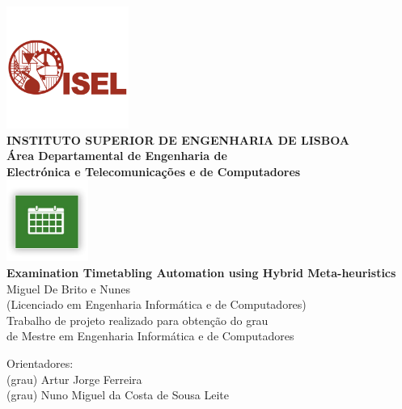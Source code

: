\begin{titlepage}
	\begin{center}
		\includegraphics[width=0.3\textwidth,natwidth=720,natheight=434]{./images/isellogo.png} \\[0.5cm]
		{\Large \textbf{INSTITUTO SUPERIOR DE ENGENHARIA DE LISBOA}} \\[0.5cm]
		{\Large \textbf{Área Departamental de Engenharia de \\Electrónica e Telecomunica\c cões e de Computadores}} \\[0.8cm]		
		\includegraphics[width=0.2\textwidth,natwidth=300,natheight=300]{./images/timetable.jpg} \\[0.8cm]
		\fontsize{18pt}{10pt}\selectfont
		{\textbf{Examination Timetabling Automation using Hybrid Meta-heuristics}} \\[0.8cm]
		\fontsize{16pt}{10pt}\selectfont
		Miguel De Brito e Nunes\\[0.2cm]
		\fontsize{14pt}{10pt}\selectfont
		(Licenciado em Engenharia Informática e de Computadores)\\[0.8cm]
		\fontsize{12pt}{10pt}\selectfont
		{Trabalho de projeto realizado para obten\c cão do grau\\de Mestre em Engenharia Informática e de Computadores} \\[0.8cm]
		\fontsize{16pt}{10pt}\selectfont
		\vfill
		\begin{tabbing}
		   \fontsize{12pt}{10pt}\selectfont
		   Orientadores: \\
		   \fontsize{11pt}{10pt}\selectfont
		   \hspace{1.1cm}(grau) Artur Jorge Ferreira \\
		   \fontsize{11pt}{10pt}\selectfont
		   \hspace{1.1cm}(grau) Nuno Miguel da Costa de Sousa Leite \\

\end{tabbing}
\end{center}
\end{titlepage}
